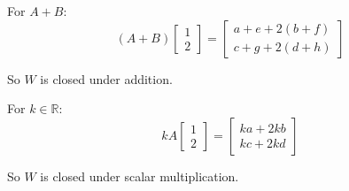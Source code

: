 For $A+B$:
\[
	(A+B)\begin{bmatrix}
		1 \\
		2
	\end{bmatrix} = \begin{bmatrix}
		a+e + 2(b+f) \\
		c+g + 2(d+h)
	\end{bmatrix}
\]

So $W$ is closed under addition.

For $k\in \mathbb{R}$:
\[
	kA\begin{bmatrix}
		1 \\
		2
	\end{bmatrix} = \begin{bmatrix}
		ka + 2kb \\
		kc + 2kd
	\end{bmatrix}
\]

So $W$ is closed under scalar multiplication.
